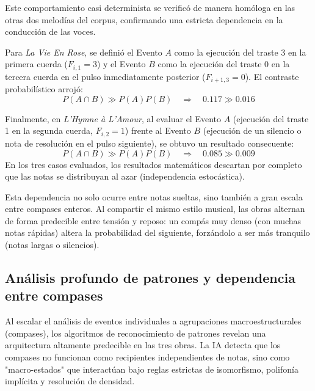 \documentclass{article}
\theoremstyle{plain}
\theoremstyle{definition}
\begin{document}
Este comportamiento casi determinista se verificó de manera homóloga en las otras dos melodías del corpus, confirmando una estricta dependencia en la conducción de las voces.

Para \textit{La Vie En Rose}, se definió el Evento $A$ como la ejecución del traste 3 en la primera cuerda ($F_{i,1} = 3$) y el Evento $B$ como la ejecución del traste 0 en la tercera cuerda en el pulso inmediatamente posterior ($F_{i+1,3} = 0$). El contraste probabilístico arrojó:
\[
	P(A \cap B) \gg P(A)P(B) \quad \Longrightarrow \quad 0.117 \gg 0.016
\]

Finalmente, en \textit{L'Hymne à L'Amour}, al evaluar el Evento $A$ (ejecución del traste 1 en la segunda cuerda, $F_{i,2} = 1$) frente al Evento $B$ (ejecución de un silencio o nota de resolución en el pulso siguiente), se obtuvo un resultado consecuente:
\[
	P(A \cap B) \gg P(A)P(B) \quad \Longrightarrow \quad 0.085 \gg 0.009
\]
En los tres casos evaluados, los resultados matemáticos descartan por completo que las notas se distribuyan al azar (independencia estocástica).

Esta dependencia no solo ocurre entre notas sueltas, sino también a gran escala entre compases enteros. Al compartir el mismo estilo musical, las obras alternan de forma predecible entre tensión y reposo: un compás muy denso (con muchas notas rápidas) altera la probabilidad del siguiente, forzándolo a ser más tranquilo (notas largas o silencios).

\subsection*{Análisis profundo de patrones y dependencia entre compases}

Al escalar el análisis de eventos individuales a agrupaciones macroestructurales (compases), los algoritmos de reconocimiento de patrones revelan una arquitectura altamente predecible en las tres obras. La IA detecta que los compases no funcionan como recipientes independientes de notas, sino como "macro-estados" que interactúan bajo reglas estrictas de isomorfismo, polifonía implícita y resolución de densidad.\\
\end{document}
